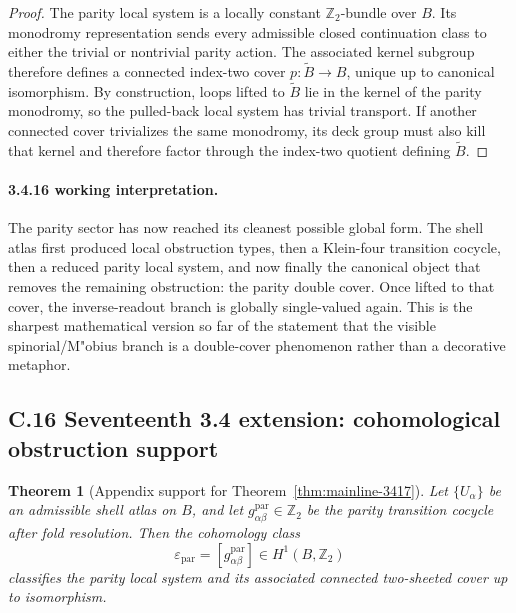 \documentclass[12pt,a4paper]{article}
\newtheorem{theorem}{Theorem}[section]
\begin{document}
\begin{proof}
The parity local system is a locally constant $\mathbb Z_2$-bundle over $B$. Its monodromy representation sends every admissible closed continuation class to either the trivial or nontrivial parity action. The associated kernel subgroup therefore defines a connected index-two cover $p:\widetilde B\to B$, unique up to canonical isomorphism. By construction, loops lifted to $\widetilde B$ lie in the kernel of the parity monodromy, so the pulled-back local system has trivial transport. If another connected cover trivializes the same monodromy, its deck group must also kill that kernel and therefore factor through the index-two quotient defining $\widetilde B$.
\end{proof}

\paragraph{3.4.16 working interpretation.}
The parity sector has now reached its cleanest possible global form. The shell atlas first produced local obstruction types, then a Klein-four transition cocycle, then a reduced parity local system, and now finally the canonical object that removes the remaining obstruction: the parity double cover. Once lifted to that cover, the inverse-readout branch is globally single-valued again. This is the sharpest mathematical version so far of the statement that the visible spinorial/M"obius branch is a double-cover phenomenon rather than a decorative metaphor.


\subsection*{C.16 Seventeenth 3.4 extension: cohomological obstruction support}

\begin{theorem}[Appendix support for Theorem~\ref{thm:mainline-3417}]
\label{thm:appendix-3417}
Let $\{U_\alpha\}$ be an admissible shell atlas on $B$, and let $g^{\mathrm{par}}_{\alpha\beta}\in\mathbb Z_2$ be the parity transition cocycle after fold resolution. Then the cohomology class
\[
 \varepsilon_{\mathrm{par}}=[g^{\mathrm{par}}_{\alpha\beta}]\in H^1(B,\mathbb Z_2)
\]
classifies the parity local system and its associated connected two-sheeted cover up to isomorphism.
\end{theorem}
\end{document}
